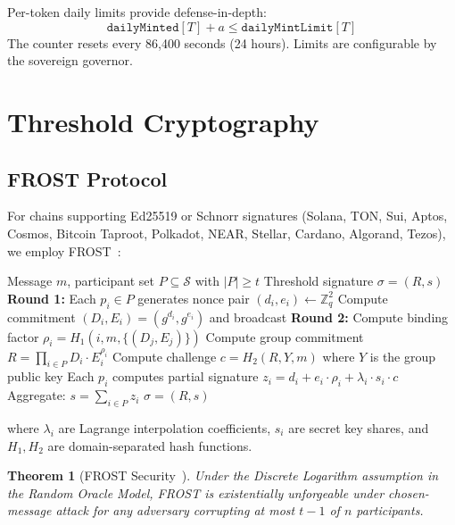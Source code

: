 \documentclass[11pt,twocolumn]{article}
\newtheorem{theorem}{Theorem}[section]
\begin{document}
Per-token daily limits provide defense-in-depth:
\begin{equation}
  \texttt{dailyMinted}[T] + a \leq \texttt{dailyMintLimit}[T]
\end{equation}
The counter resets every 86,400 seconds (24 hours). Limits are configurable by the sovereign governor.

\section{Threshold Cryptography}

\subsection{FROST Protocol}

For chains supporting Ed25519 or Schnorr signatures (Solana, TON, Sui, Aptos, Cosmos, Bitcoin Taproot, Polkadot, NEAR, Stellar, Cardano, Algorand, Tezos), we employ FROST~\cite{frost}:

\begin{algorithm}
\caption{FROST Threshold Signing ($t$-of-$n$)}
\begin{algorithmic}[1]
\Require Message $m$, participant set $P \subseteq \mathcal{S}$ with $|P| \geq t$
\Ensure Threshold signature $\sigma = (R, s)$
\State \textbf{Round 1:} Each $p_i \in P$ generates nonce pair $(d_i, e_i) \gets \mathbb{Z}_q^2$
\State Compute commitment $(D_i, E_i) = (g^{d_i}, g^{e_i})$ and broadcast
\State \textbf{Round 2:} Compute binding factor $\rho_i = H_1(i, m, \{(D_j, E_j)\})$
\State Compute group commitment $R = \prod_{i \in P} D_i \cdot E_i^{\rho_i}$
\State Compute challenge $c = H_2(R, Y, m)$ where $Y$ is the group public key
\State Each $p_i$ computes partial signature $z_i = d_i + e_i \cdot \rho_i + \lambda_i \cdot s_i \cdot c$
\State Aggregate: $s = \sum_{i \in P} z_i$
\State \Return $\sigma = (R, s)$
\end{algorithmic}
\end{algorithm}

\noindent
where $\lambda_i$ are Lagrange interpolation coefficients, $s_i$ are secret key shares, and $H_1, H_2$ are domain-separated hash functions.

\begin{theorem}[FROST Security~\cite{frost}]
Under the Discrete Logarithm assumption in the Random Oracle Model, FROST is existentially unforgeable under chosen-message attack for any adversary corrupting at most $t - 1$ of $n$ participants.
\end{theorem}
\end{document}
